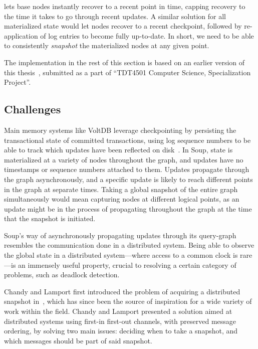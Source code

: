  lets base nodes instantly recover to a recent point in
time, capping recovery to the time it takes to go through recent updates. A
similar solution for all materialized state would let nodes recover to a recent
checkpoint, followed by re-application of log entries to become fully
up-to-date. In short, we need to be able to consistently \textit{snapshot} the
materialized nodes at any given point.

The implementation in the rest of this section is based on an earlier version of
this thesis~\cite{project}, submitted as a part of ``TDT4501 Computer Science,
Specialization Project''.

\subsection{Challenges}

Main memory systems like VoltDB leverage checkpointing by persisting the
transactional state of committed transactions, using log sequence numbers to be
able to track which updates have been reflected on disk~\cite{voltdb-recovery}.
In Soup, state is materialized at a variety of nodes throughout the graph, and
updates have no timestamps or sequence numbers attached to them. Updates
propagate through the graph asynchronously, and a specific update is likely to
reach different points in the graph at separate times. Taking a global snapshot
of the entire graph simultaneously would mean capturing nodes at different
logical points, as an update might be in the process of propagating throughout
the graph at the time that the snapshot is initiated.

Soup's way of asynchronously propagating updates through its query-graph
resembles the communication done in a distributed system. Being able to observe
the global state in a distributed system---where access to a common clock is
rare---is an immensely useful property, crucial to resolving a certain category
of problems, such as deadlock detection.

Chandy and Lamport first introduced the problem of acquiring a distributed
snapshot in~\cite{chandy-lamport}, which has since been the source of
inspiration for a wide variety of work within the field. Chandy and Lamport
presented a solution aimed at distributed systems using first-in first-out
channels, with preserved message ordering, by solving two main issues: deciding
when to take a snapshot, and which messages should be part of said snapshot.

